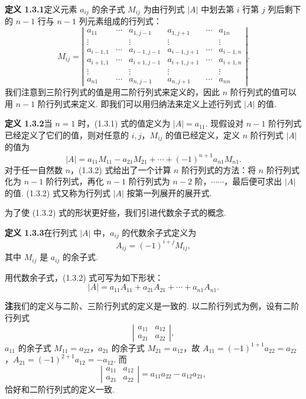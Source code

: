 \documentclass[UTF8, 12pt, fontset=fandol, oneside]{ctexart}
\begin{document}
\noindent\textbf{定义 1.3.1}\quad 定义元素 $a_{ij}$ 的余子式 $M_{ij}$ 为由行列式 $|A|$ 中划去第 $i$ 行第 $j$ 列后剩下的 $n-1$ 行与 $n-1$ 列元素组成的行列式：
\[
M_{ij}=
\left|\begin{array}{cccccc}
a_{11} & \cdots & a_{1,j-1} & a_{1,j+1} & \cdots & a_{1n}\\
\vdots & & \vdots & \vdots & & \vdots\\
a_{i-1,1} & \cdots & a_{i-1,j-1} & a_{i-1,j+1} & \cdots & a_{i-1,n}\\
a_{i+1,1} & \cdots & a_{i+1,j-1} & a_{i+1,j+1} & \cdots & a_{i+1,n}\\
\vdots & & \vdots & \vdots & & \vdots\\
a_{n1} & \cdots & a_{n,j-1} & a_{n,j+1} & \cdots & a_{nn}
\end{array}\right|.
\]
我们注意到三阶行列式的值是用二阶行列式来定义的，因此 $n$ 阶行列式的值可以用 $n-1$ 阶行列式来定义. 即我们可以用归纳法来定义上述行列式 $|A|$ 的值.

\noindent\textbf{定义 1.3.2}\quad 当 $n=1$ 时，(1.3.1) 式的值定义为 $|A|=a_{11}$. 现假设对 $n-1$ 阶行列式已经定义了它们的值，则对任意的 $i,j$，$M_{ij}$ 的值已经定义，定义 $n$ 阶行列式 $|A|$ 的值为
\begin{equation}
|A|=a_{11}M_{11}-a_{21}M_{21}+\cdots+(-1)^{n+1}a_{n1}M_{n1}.
\tag{1.3.2}
\end{equation}
对于任一自然数 $n$，(1.3.2) 式给出了一个计算 $n$ 阶行列式的方法：将 $n$ 阶行列式化为 $n-1$ 阶行列式，再化 $n-1$ 阶行列式为 $n-2$ 阶，$\cdots\cdots$，最后便可求出 $|A|$ 的值. (1.3.2) 式又称为行列式 $|A|$ 按第一列展开的展开式.

为了使 (1.3.2) 式的形状更好些，我们引进代数余子式的概念.

\noindent\textbf{定义 1.3.3}\quad 在行列式 $|A|$ 中，$a_{ij}$ 的代数余子式定义为
\[
A_{ij}=(-1)^{i+j}M_{ij},
\]
其中 $M_{ij}$ 是 $a_{ij}$ 的余子式.

用代数余子式，(1.3.2) 式可写为如下形状：
\begin{equation}
|A|=a_{11}A_{11}+a_{21}A_{21}+\cdots+a_{n1}A_{n1}.
\tag{1.3.3}
\end{equation}

\noindent\textbf{注}\quad 我们的定义与二阶、三阶行列式的定义是一致的. 以二阶行列式为例，设有二阶行列式
\[
\left|\begin{array}{cc}
a_{11} & a_{12}\\
a_{21} & a_{22}
\end{array}\right|,
\]
$a_{11}$ 的余子式 $M_{11}=a_{22}$，$a_{21}$ 的余子式 $M_{21}=a_{12}$，故 $A_{11}=(-1)^{1+1}a_{22}=a_{22}$，$A_{21}=(-1)^{2+1}a_{12}=-a_{12}$. 而
\[
\left|\begin{array}{cc}
a_{11} & a_{12}\\
a_{21} & a_{22}
\end{array}\right|=a_{11}a_{22}-a_{12}a_{21},
\]
恰好和二阶行列式的定义一致.
\end{document}
